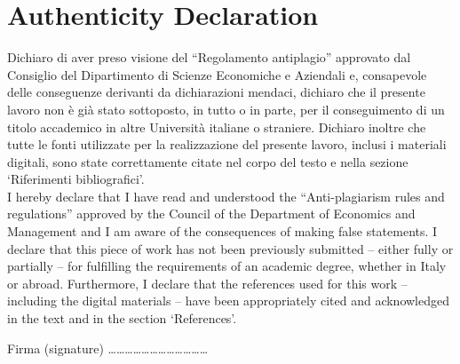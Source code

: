 \chapter*{Authenticity Declaration}
\thispagestyle{empty}

Dichiaro di aver preso visione del “Regolamento antiplagio” approvato dal Consiglio del Dipartimento di Scienze Economiche e Aziendali e, consapevole delle conseguenze derivanti da dichiarazioni mendaci, dichiaro che il presente lavoro non è già stato sottoposto, in tutto o in parte, per il conseguimento di un titolo accademico in altre Università italiane o straniere. Dichiaro inoltre che tutte le fonti utilizzate per la realizzazione del presente lavoro, inclusi i materiali digitali, sono state correttamente citate nel corpo del testo e nella sezione ‘Riferimenti bibliografici’. \\



I hereby declare that I have read and understood the “Anti-plagiarism rules and regulations” approved by the Council of the Department of Economics and Management and I am aware of the consequences of making false statements. I declare that this piece of work has not been previously submitted -- either fully or partially -- for fulfilling the requirements of an academic degree, whether in Italy or abroad. Furthermore, I declare that the references used for this work -- including the digital materials -- have been appropriately cited and acknowledged in the text and in the section ‘References’. \\

\vspace{1cm}

Firma (signature) ………………………………
